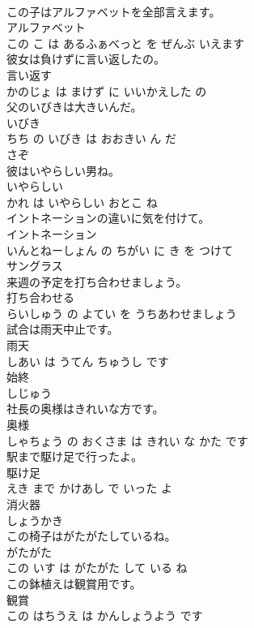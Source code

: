 \documentclass[8pt]{extreport}
\begin{document}
\begin{CJK}{UTF8}{min}
\\	この子はアルファベットを全部言えます。	
\\	アルファベット 
\\	この こ は あるふぁべっと を ぜんぶ いえます			
\\	彼女は負けずに言い返したの。	
\\	言い返す 
\\	かのじょ は まけず に いいかえした の			
\\	父のいびきは大きいんだ。	
\\	いびき 
\\	ちち の いびき は おおきい ん だ			
\\	さぞ	
\\	彼はいやらしい男ね。	
\\	いやらしい 
\\	かれ は いやらしい おとこ ね			
\\	イントネーションの違いに気を付けて。	
\\	イントネーション 
\\	いんとねーしょん の ちがい に き を つけて			
\\	サングラス	
\\	来週の予定を打ち合わせましょう。	
\\	打ち合わせる 
\\	らいしゅう の よてい を うちあわせましょう			
\\	試合は雨天中止です。	
\\	雨天 
\\	しあい は うてん ちゅうし です			
\\	始終	
\\	しじゅう			
\\	社長の奥様はきれいな方です。	
\\	奥様 
\\	しゃちょう の おくさま は きれい な かた です			
\\	駅まで駆け足で行ったよ。	
\\	駆け足 
\\	えき まで かけあし で いった よ			
\\	消火器	
\\	しょうかき			
\\	この椅子はがたがたしているね。	
\\	がたがた 
\\	この いす は がたがた して いる ね			
\\	この鉢植えは観賞用です。	
\\	観賞 
\\	この はちうえ は かんしょうよう です			

\end{CJK}
\end{document}
